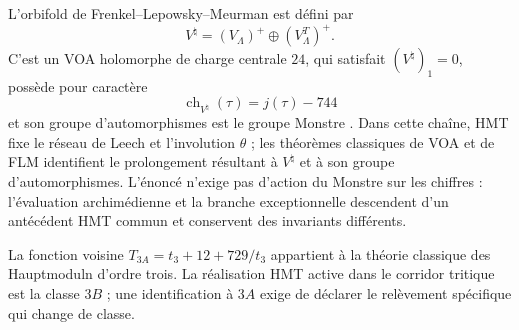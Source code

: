L'orbifold de Frenkel--Lepowsky--Meurman est défini par
\[
 V^\natural=(V_\Lambda)^+\oplus(V_\Lambda^T)^+.
\]
C'est un VOA holomorphe de charge centrale \(24\), qui satisfait
\((V^\natural)_1=0\), possède pour caractère
\[
 \operatorname{ch}_{V^\natural}(\tau)=j(\tau)-744
\]
et son groupe d'automorphismes est le groupe Monstre
\cite{FLM1988,ConwayNorton1979,Borcherds1992}. Dans cette chaîne, HMT fixe le
réseau de Leech et l'involution \(\theta\) ; les théorèmes classiques de VOA et
de FLM identifient le prolongement résultant à \(V^\natural\) et à son groupe
d'automorphismes. L'énoncé n'exige pas d'action du Monstre sur les
chiffres : l'évaluation archimédienne et la branche exceptionnelle descendent d'un
antécédent HMT commun et conservent des invariants différents.

La fonction voisine
\(T_{3A}=t_3+12+729/t_3\) appartient à la théorie classique des Hauptmoduln
d'ordre trois. La réalisation HMT active dans le corridor tritique est la classe
\(3B\) ; une identification à \(3A\) exige de déclarer le relèvement spécifique
qui change de classe.
